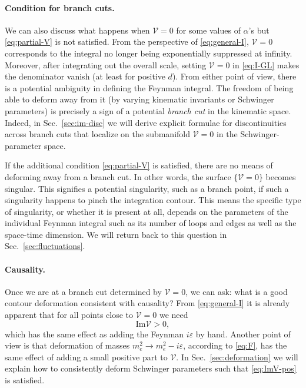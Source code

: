\documentclass[12pt]{article}
\numberwithin{figure}{section}
\def \be {\begin{equation}}
\def \ee {\end{equation}}
\def \eps {\varepsilon}
\def \V {\mathcal{V}}
\def \Im {\mathrm{Im}}
\begin{document}
    \paragraph{Condition for branch cuts.}
    We can also discuss what happens when $\V=0$ for some values of $\alpha$'s but \eqref{eq:partial-V} is not satisfied.
    From the perspective of \eqref{eq:general-I}, $\V=0$ corresponds to the integral no longer being exponentially suppressed at infinity. Moreover, after integrating out the overall scale, setting $\V=0$ in \eqref{eq:I-GL} makes the denominator vanish (at least for positive $d$). From either point of view, there is a potential ambiguity in defining the Feynman integral.
    The freedom of being able to deform away from it (by varying kinematic invariants or Schwinger parameters) is precisely a sign of a potential \emph{branch cut} in the kinematic space. Indeed, in Sec.~\ref{sec:im-disc} we will derive explicit formulae for discontinuities across branch cuts that localize on the submanifold $\V=0$ in the Schwinger-parameter space.
    
    If the additional condition \eqref{eq:partial-V} is satisfied, there are no means of deforming away from a branch cut. In other words, the surface $\{\V=0\}$ becomes singular. This signifies a potential singularity, such as a branch point, if such a singularity happens to pinch the integration contour. This means the specific type of singularity, or whether it is present at all, depends on the parameters of the individual Feynman integral such as its number of loops and edges as well as the space-time dimension. We will return back to this question in Sec.~\ref{sec:fluctuations}.
    
    \paragraph{Causality.}
    Once we are at a branch cut determined by $\V=0$, we can ask: what is a good contour deformation consistent with causality? From \eqref{eq:general-I} it is already apparent that for all points close to $\V = 0$ we need
    \be\label{eq:ImV-pos}
    \Im \V > 0,
    \ee
    which has the same effect as adding the Feynman $i\eps$ by hand. Another point of view is that deformation of masses $m_e^2 \to m_e^2 - i\eps$, according to \eqref{eq:F}, has the same effect of adding a small positive part to $\V$. In Sec.~\ref{sec:deformation} we will explain how to consistently deform Schwinger parameters such that \eqref{eq:ImV-pos} is satisfied.
    
\end{document}
